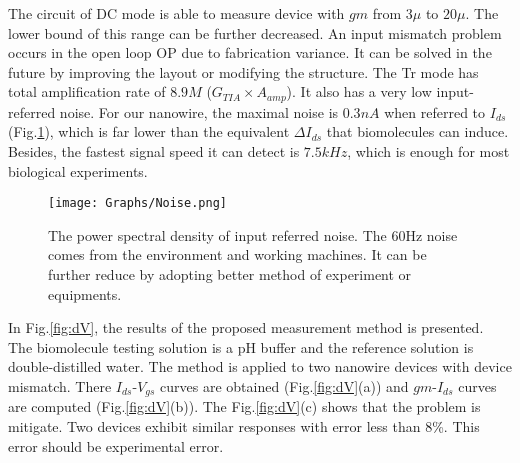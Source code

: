 \documentclass{article}
\begin{document}
The circuit of DC mode is able to measure device with $gm$ from $3\mu$ to $20\mu$.
The lower bound of this range can be further decreased.
An input mismatch problem occurs in the open loop OP due to fabrication variance.
It can be solved in the future by improving the layout or modifying the structure.
The Tr mode has total amplification rate of $8.9M$ ($G_{TIA} \times A_{amp}$).
It also has a very low input-referred noise.
For our nanowire, the maximal noise is $0.3nA$ when referred to $I_{ds}$ (Fig.\ref{fig:noise}), which is far lower than the equivalent $\Delta I_{ds}$ that biomolecules can induce.
Besides, the fastest signal speed it can detect is $7.5kHz$, which is enough for most biological experiments.

\begin{figure}[!htb]
        \centering
        \texttt{[image: Graphs/Noise.png]}
    \caption{The power spectral density of input referred noise. The 60Hz noise comes from the environment and working machines. It can be further reduce by adopting better method of experiment or equipments.}
    \label{fig:noise}
\end{figure}

In Fig.\ref{fig:dV}, the results of the proposed measurement method is presented.
The biomolecule testing solution is a pH buffer and the reference solution is double-distilled water.
The method is applied to two nanowire devices with device mismatch.
There $I_{ds}$-$V_{gs}$ curves are obtained (Fig.\ref{fig:dV}(a)) and $gm$-$I_{ds}$ curves are computed (Fig.\ref{fig:dV}(b)).
The Fig.\ref{fig:dV}(c) shows that the problem is mitigate.
Two devices exhibit similar responses with error less than 8\%.
This error should be experimental error.
\end{document}
